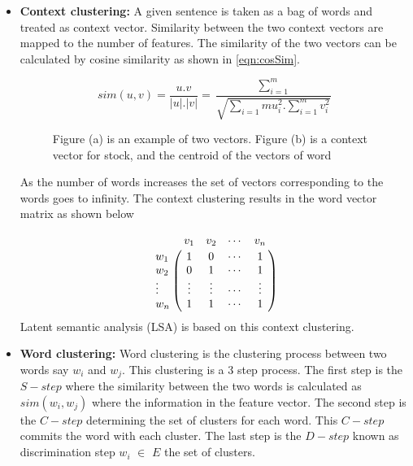 \documentclass{bmcart}
\begin{document}
\begin{itemize}
\item {\bf Context clustering:} A given sentence is taken as a bag of words and treated as context vector. Similarity between the two context vectors are mapped to the number of features. The similarity of the two vectors can be calculated by cosine similarity as shown in \ref{eqn:cosSim}.
\begin{center}
\vspace{-5mm}
\begin{equation}
sim(u,v)=\frac{u.v}{|u|.|v|}=\frac{\sum_{i=1}^{m}}{\sqrt{\sum_{i=1}{m}u_i^2 . \sum_{i=1}^{m}v_i^2}}
\end{equation}
\label{eqn:cosSim}
\end{center}

\begin{figure}
\centering
{}
\caption{Figure (a) is an example of two vectors. Figure (b) is a context vector for stock, and the centroid of the vectors of word}
\label{fig:vectorSpace}
\end{figure}
As the number of words increases the set of vectors corresponding to the words goes to infinity. The context clustering results in the word vector matrix as shown below

\begin{equation}
\bordermatrix{~ & v_1 & v_2 & \cdots & v_n \cr
                  w_1 & 1 & 0 & \cdots & 1 \cr
                  w_2 & 0 & 1 & \cdots & 1 \cr
                  \vdots & \vdots &  \vdots & \cdots & \vdots \cr
                  w_n & 1 & 1 & \cdots & 1}
\end{equation}
Latent semantic analysis (LSA) is based on this context clustering.

\item {\bf Word clustering:} Word clustering is the clustering process between two words say $w_i$ and $w_j$. This clustering is a 3 step process. The first step is the $S-step$ where the similarity between the two words is calculated as $sim(w_i,w_j)$ where the information in the  feature vector. The second step is the $C-step$  determining the set of clusters for each word. This $C-step$ commits the word with each cluster. The last step is the $D-step$ known as discrimination step $w_i$ $\in$ $E$ the set of clusters. 


\end{itemize}
\end{document}

